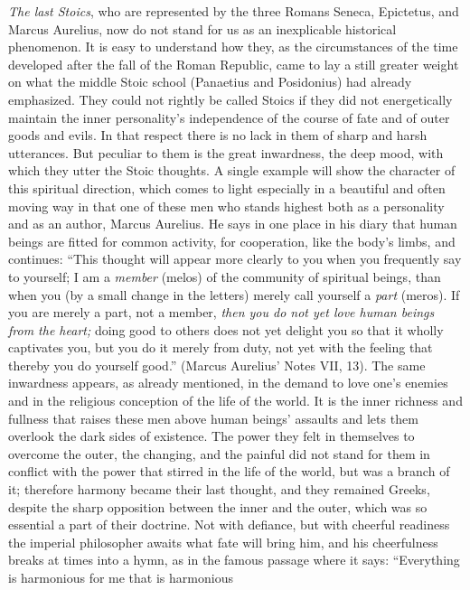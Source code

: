 \documentclass[12pt,a4paper,openany]{book}
\newcommand{\opage}[1]{\marginnote{\footnotesize\textit{[#1]}}}
\begin{document}
\emph{The last Stoics}, who are represented by the three Romans
Seneca, Epictetus, and Marcus Aurelius, now do not stand for us
as an inexplicable historical phenomenon. It is easy to
understand how they, as the circumstances of the time developed
after the fall of the Roman Republic, came to
lay a still greater weight on what the
middle Stoic school (Panaetius and Posidonius) had already
emphasized. They could not rightly be called Stoics
if they did not energetically maintain the inner personality's
independence of the course of fate and of outer goods and
evils. In that respect there is no lack in them of
sharp and harsh utterances. But peculiar to them is
the great inwardness, the deep mood, with which they utter
the Stoic thoughts. A single example will show the character
of this spiritual direction, which comes to light especially in a
beautiful and often moving way in that one of these men who
stands highest both as a personality and as an author, Marcus
Aurelius. He says in one place in his diary that human beings are
fitted for common activity, for cooperation, like the body's
\opage{173}limbs, and continues: ``This thought will appear more clearly to
you when you frequently say to yourself; I am a \emph{member} (melos) of the
community of spiritual beings, than when you (by a small
change in the letters) merely call yourself a \emph{part} (meros). If
you are merely a part, not a member, \emph{then you do not yet love
human beings from the heart;} doing good to others does not yet delight you
so that it wholly captivates you, but you do it merely
from duty, not yet with the feeling that thereby you do yourself
good.'' (Marcus Aurelius' Notes VII, 13). The same
inwardness appears, as already mentioned, in
the demand to love one's enemies and in the religious conception
of the life of the world. It is the inner richness and fullness that
raises these men above human beings' assaults and lets them
overlook the dark sides of existence. The power they felt in
themselves to overcome the outer, the changing, and the painful did
not stand for them in conflict with the power that stirred in
the life of the world, but was a branch of it; therefore harmony became
their last thought, and they remained Greeks, despite
the sharp opposition between the inner and the outer, which
was so essential a part of their doctrine. Not with defiance,
but with cheerful readiness the imperial philosopher awaits
what fate will bring him, and his cheerfulness breaks
at times into a hymn, as in the famous passage where
it says: ``Everything is harmonious for me that is harmonious
\end{document}
